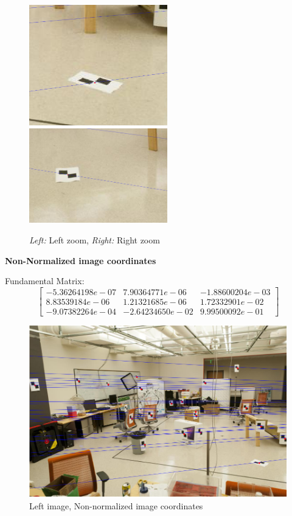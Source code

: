 \documentclass[11pt]{article}
\begin{document}
\begin{figure}[H]
    \centering
    \includegraphics[width=6cm]{images/part2/normalize_1_left_zoom.png}
    \includegraphics[width=6cm]{images/part2/normalize_1_right_zoom.png}
    \caption{\emph{Left:} Left zoom, \emph{Right:} Right zoom}
\end{figure}


\textbf{Non-Normalized image coordinates}

Fundamental Matrix:
\begin{equation*}
    \begin{bmatrix}
        -5.36264198e-07 & 7.90364771e-06 & -1.88600204e-03  \\
        8.83539184e-06 & 1.21321685e-06 & 1.72332901e-02    \\
        -9.07382264e-04 & -2.64234650e-02 & 9.99500092e-01
    \end{bmatrix}
\end{equation*}

\begin{figure}[H]
    \centering
    \includegraphics[width=15cm]{images/part2/non-normalize_1_left.png}
    \caption{Left image, Non-normalized image coordinates}
\end{figure}
\end{document}
